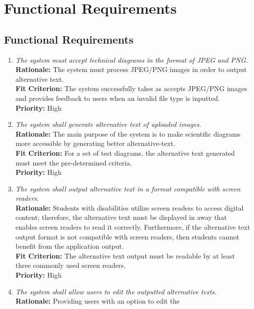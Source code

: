 \documentclass[12pt]{article}
\begin{document}
\section{Functional Requirements}
\subsection{Functional Requirements}
\begin{enumerate}[label=FR \arabic*., wide=0pt, leftmargin=*]
  \item \emph{The system must accept technical diagrams in the format
    of JPEG and PNG.}\\[2mm]
    {\bf Rationale:} The system must process JPEG/PNG images in order
    to output alternative text. \\
    {\bf Fit Criterion:} The system successfully takes as accepts
    JPEG/PNG images and provides feedback to users when an invalid
    file type is inputted.  \\
    {\bf Priority:} High
  \item \emph{The system shall generate alternative text of uploaded
    images.}\\[2mm]
    {\bf Rationale:} The main purpose of the system is to make
    scientific diagrams more accessible by generating better
    alternative-text. \\
    {\bf Fit Criterion:} For a set of test diagrams, the alternative
    text generated must meet the pre-determined criteria.\\
    {\bf Priority:} High
  \item \emph{The system shall output alternative text in a format
    compatible with screen readers.}\\[2mm]
    {\bf Rationale:} Students with disabilities utilize screen
    readers to access digital content; therefore, the alternative
    text must be displayed in away that enables screen readers to
    read it correctly. Furthermore, if the alternative text output
    format is not compatible with screen readers, then students
    cannot benefit from the application output.\\
    {\bf Fit Criterion:} The alternative text output must be readable
    by at least three commonly used screen readers.\\
    {\bf Priority:} High
  \item \emph{The system shall allow users to edit the outputted
    alternative texts.}\\[2mm]
    {\bf Rationale:} Providing users with an option to edit the

\end{enumerate}
\end{document}
